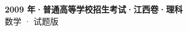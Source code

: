 \documentclass[zihao=-4, a4paper]{ctexart}
\begin{document}
\begin{center}
  {\Large\bfseries 2009 年·普通高等学校招生考试·江西卷·理科}\\[4pt]
  {\large 数学 · 试题版}
\end{center}
\medskip
{}

\end{document}
